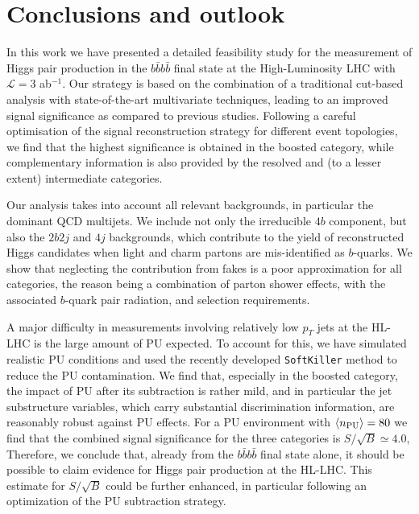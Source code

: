 \section{Conclusions and outlook}
\label{sec:conclusions}

In this work we have presented a detailed feasibility study for
 the measurement of Higgs pair production in the $b\bar{b}b\bar{b}$
final state at the High-Luminosity LHC with $\mathcal{L}=3$ ab$^{-1}$.
%
Our strategy is based on the combination of a traditional
cut-based analysis with state-of-the-art multivariate techniques,
leading to an improved signal significance 
as compared to previous studies.
%
Following a careful optimisation of the
signal reconstruction strategy for different event topologies,
we find that the highest significance is obtained
in the 
boosted category, while complementary information is also provided
by the resolved and (to a lesser extent) intermediate categories.
%

Our analysis takes into account 
all relevant backgrounds, in particular
the dominant QCD multijets.
%
We include not only the irreducible $4b$ component, but
also the $2b2j$ and $4j$ backgrounds, which contribute
to the yield of reconstructed Higgs candidates
when light and charm partons are mis-identified as $b$-quarks.
%
We show that neglecting the contribution
from  fakes is a poor approximation for all categories, the reason
being a combination of parton shower effects, with the associated $b$-quark
pair radiation, and selection requirements.

A major difficulty in measurements involving relatively low $p_T$
jets at the HL-LHC is the large
amount of PU expected.
%
To account for this, we have simulated realistic PU conditions
and used the recently developed {\tt SoftKiller} method to reduce
the PU contamination.
%
We find that, especially in the boosted category, the impact of
PU after its subtraction is rather mild, and in particular the jet
substructure variables, which carry substantial
discrimination information, are reasonably robust against PU effects.
%
For a PU environment with $\left\langle n_{\rm PU}\right\rangle=80$ we find that the combined
signal significance for the three categories is $S/\sqrt{B}\simeq 4.0$,
%
Therefore, we conclude that, already from the $b\bar{b}b\bar{b}$
final state alone,
it should be possible to claim evidence for Higgs pair production at
the HL-LHC.
%
This  estimate for $S/\sqrt{B}$  could
be further enhanced,
in particular following an optimization of the PU subtraction
strategy.

